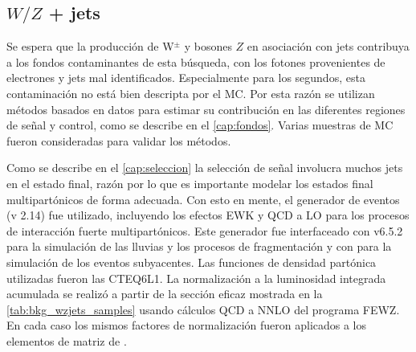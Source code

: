 \begin{table}[!htbp]
\begin{tabular}{lccccc}
  \end{tabular}
  \label{tab:bkg_wzgamma_samples}
\end{table}


\subsection{$W/Z$ + jets}
\label{mc_wzjets}

Se espera que la producción de W$^{\pm}$ y bosones $Z$ en asociación con jets
contribuya a los fondos contaminantes de esta búsqueda, con los fotones provenientes de electrones y jets
mal identificados. Especialmente para los segundos, esta contaminación no está
bien descripta por el MC. Por esta razón se utilizan métodos basados en datos
para estimar su contribución en las diferentes regiones de señal y control, como
se describe en el \cref{cap:fondos}. Varias muestras de MC
fueron consideradas para validar los métodos.

Como se describe en el \cref{cap:seleccion} la selección de señal involucra
muchos jets en el estado final, razón por lo que es importante modelar los estados final
multipartónicos de forma adecuada. Con esto en mente, el generador de eventos
{\alpgen} (v 2.14) fue utilizado, incluyendo los efectos EWK y QCD a LO para los
procesos de interacción fuerte multipartónicos. Este generador fue interfaceado
con {\herwig} v6.5.2 para la simulación de las lluvias y los procesos de
fragmentación y con {\jimmy} para la simulación de los eventos subyacentes. Las
funciones de densidad partónica utilizadas fueron las CTEQ6L1. La normalización
a la luminosidad integrada acumulada se realizó a partir de la sección eficaz
mostrada en la \cref{tab:bkg_wzjets_samples} usando cálculos QCD a NNLO del
programa FEWZ\cite{Anastasiou:2003ds}. En cada caso los mismos factores de
normalización fueron aplicados a los elementos de matriz de {\alpgen}.

